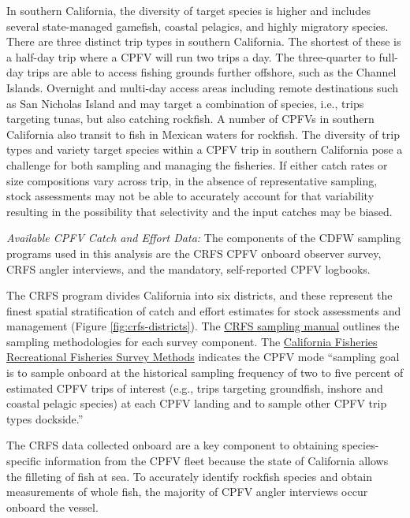 \documentclass[11pt,
  english,
  letterpaper,
]{article}
\begin{document}
In southern California, the diversity of target species is higher and includes several state-managed gamefish, coastal pelagics, and highly migratory species. There are three distinct trip types in southern California. The shortest of these is a half-day trip where a CPFV will run two trips a day. The three-quarter to full-day trips are able to access fishing grounds further offshore, such as the Channel Islands. Overnight and multi-day access areas including remote destinations such as San Nicholas Island and may target a combination of species, i.e., trips targeting tunas, but also catching rockfish. A number of CPFVs in southern California also transit to fish in Mexican waters for rockfish. The diversity of trip types and variety target species within a CPFV trip in southern California pose a challenge for both sampling and managing the fisheries. If either catch rates or size compositions vary across trip, in the absence of representative sampling, stock assessments may not be able to accurately account for that variability resulting in the possibility that selectivity and the input catches may be biased.

\emph{Available CPFV Catch and Effort Data:} The components of the CDFW sampling programs used in this analysis are the CRFS CPFV onboard observer survey, CRFS angler interviews, and the mandatory, self-reported CPFV logbooks.

The CRFS program divides California into six districts, and these represent the finest spatial stratification of catch and effort estimates for stock assessments and management (Figure \ref{fig:crfs-districts}). The \href{https://nrm.dfg.ca.gov/FileHandler.ashx?DocumentID=62348\&inline}{CRFS sampling manual} outlines the sampling methodologies for each survey component. The \href{https://nrm.dfg.ca.gov/FileHandler.ashx?DocumentID=36136\&inline}{California Fisheries Recreational Fisheries Survey Methods} indicates the CPFV mode ``sampling goal is to sample onboard at the historical sampling frequency of two to five percent of estimated CPFV trips of interest (e.g., trips targeting groundfish, inshore and coastal pelagic species) at each CPFV landing and to sample other CPFV trip types dockside.''

The CRFS data collected onboard are a key component to obtaining species-specific information from the CPFV fleet because the state of California allows the filleting of fish at sea. To accurately identify rockfish species and obtain measurements of whole fish, the majority of CPFV angler interviews occur onboard the vessel.
\end{document}
